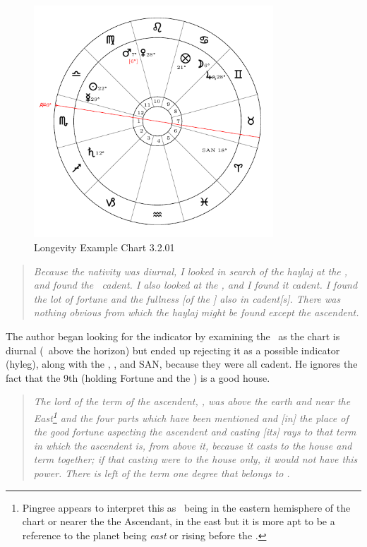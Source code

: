 \begin{figure}[H]
\centering
\includegraphics[width=0.8\textwidth]{charts/3_2_01}
\vspace{-1em}
\caption{Longevity Example Chart 3.2.01}
\end{figure}

\begin{quote}
\textsl{Because the nativity was diurnal, I looked in search of the haylaj at the \Sun, and found the \Sun\, cadent. I also looked at the \Moon, and I found it cadent. I found the lot of fortune and the fullness [of the \Moon] also in cadent[s]. There was nothing obvious from which the haylaj might be found except the ascendent.}
\end{quote}

The author began looking for the indicator by examining the \Sun\, as the chart is diurnal (\Sun\, above the horizon) but ended up rejecting it as a possible indicator (hyleg), along with the \Moon, \Fortune, and SAN, because they were all cadent. He ignores the fact that the 9th (holding Fortune and the \Moon) is a good house.

\begin{quote}
\textsl{The lord of the term of the ascendent, \Mars, was above the earth and near the East\footnote{Pingree appears to interpret this as \Mars\, being in the eastern hemisphere of the chart or nearer the the Ascendant, in the east but it is more apt to be a reference to the planet being \textsl{east} or rising before the \Sun.} and the four parts which have been mentioned and [in] the place of the good fortune aspecting the ascendent and casting [its] rays to that term in which the ascendent is, from above it, because it casts to the house and term together; if that casting were to the house only, it would not have this power. There is left of the term one degree that belongs to \Mars.}
\end{quote}

